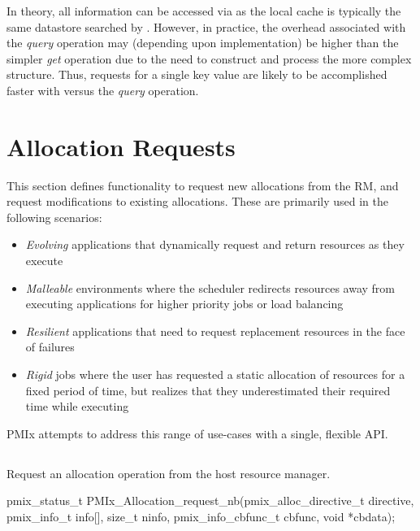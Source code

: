 In theory, all information can be accessed via  as the local cache is typically the same datastore searched by . However, in practice, the overhead associated with the \emph{query} operation may (depending upon implementation) be higher than the simpler \emph{get} operation due to the need to construct and process the more complex  structure. Thus, requests for a single key value are likely to be accomplished faster with  versus the \emph{query} operation.


\section{Allocation Requests}
\label{chap:api_job_mgmt:alloc}

This section defines functionality to request new allocations from the \ac{RM}, and request modifications to existing allocations.
These are primarily used in the following scenarios:
\begin{itemize}
\item \textit{Evolving} applications that dynamically request and return resources as they execute
\item \textit{Malleable} environments where the scheduler redirects resources away from executing applications for higher priority jobs or load balancing
\item \textit{Resilient} applications that need to request replacement resources in the face of failures
\item \textit{Rigid} jobs where the user has requested a static allocation of resources for a fixed period of time, but realizes that they underestimated their required time while executing
\end{itemize}
\ac{PMIx} attempts to address this range of use-cases with a single, flexible \ac{API}.

\subsection{}

\summary

Request an allocation operation from the host resource manager.

\format

\cspecificstart
\begin{codepar}
pmix_status_t
PMIx_Allocation_request_nb(pmix_alloc_directive_t directive,
                           pmix_info_t info[], size_t ninfo,
                           pmix_info_cbfunc_t cbfunc, void *cbdata);
\end{codepar}
\cspecificend

